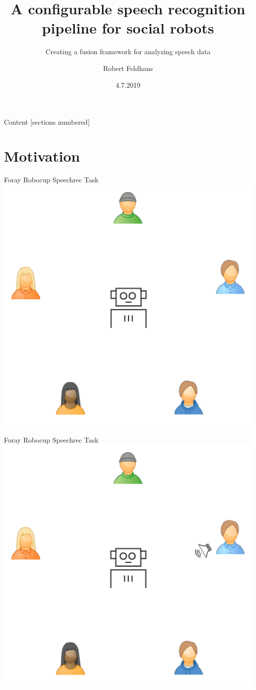 \documentclass{beamer}
\title{A configurable speech recognition pipeline for social robots}
\subtitle{Creating a fusion framework for analyzing speech data}
\date{4.7.2019}
\institute{Master Thesis}
\author{Robert Feldhans}
\begin{document}
	\maketitle
	
	\begin{frame}{Content}
		[sections numbered]
		\tableofcontents[hideallsubsections]
	\end{frame}
	
	
	
	
	
	
	
	\section{Motivation}
	
	\begin{frame}{Foray Robocup Speechrec Task}
		\centering
		\includegraphics[width=.75\textwidth]{Bilder/robocup_task}
	\end{frame}
	
	\begin{frame}{Foray Robocup Speechrec Task}
		\centering
		\includegraphics[width=.75\textwidth]{Bilder/robocup_task_1}
	\end{frame}
	
\end{document}
